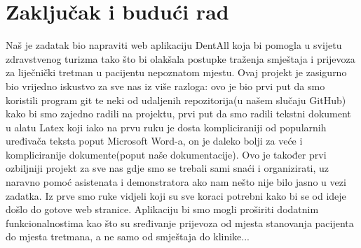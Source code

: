 \chapter{Zaključak i budući rad}

		 Naš je zadatak bio napraviti web aplikaciju DentAll koja bi pomogla u svijetu zdravstvenog turizma tako što bi olakšala postupke traženja smještaja i prijevoza za liječnički tretman u pacijentu nepoznatom mjestu. Ovaj projekt je zasigurno bio vrijedno iskustvo za sve nas iz više razloga: ovo je bio prvi put da smo koristili program git te neki od udaljenih repozitorija(u našem slučaju GitHub) kako bi smo zajedno radili na projektu, prvi put da smo radili tekstni dokument u alatu Latex koji iako na prvu ruku je dosta kompliciraniji od popularnih uređivača teksta poput Microsoft Word-a, on je daleko bolji za veće i kompliciranije dokumente(poput naše dokumentacije). Ovo je također prvi ozbiljniji projekt za sve nas gdje smo se trebali sami snaći i organizirati, uz naravno pomoć asistenata i demonstratora ako nam nešto nije bilo jasno u vezi zadatka. Iz prve smo ruke vidjeli koji su sve koraci potrebni kako bi se od ideje došlo do gotove web stranice. Aplikaciju bi smo mogli proširiti dodatnim funkcionalnostima kao što su sređivanje prijevoza od mjesta stanovanja pacijenta do mjesta tretmana, a ne samo od smještaja do klinike...
		
		\eject 